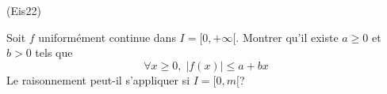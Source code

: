 \begin{tiny}(Eis22)\end{tiny}
Soit $f$ uniform{\'e}ment continue dans $I=[0,+\infty[$. Montrer qu'il existe $a\geq 0$ et $b>0$ tels que 
\begin{displaymath}
\forall x \geq 0, \; \left|f(x) \right| \leq a + bx  
\end{displaymath}
Le raisonnement peut-il s'appliquer si $I = [0, m[$?
